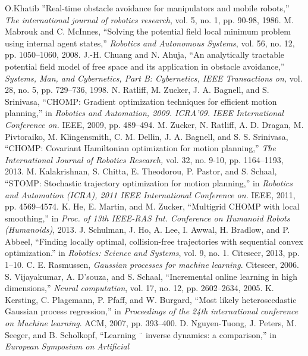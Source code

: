 \documentclass{IEEEtran}
\begin{document}
\begin{thebibliography}{99}
O.Khatib ''Real-time obstacle avoidance for manipulators and mobile
robots,''\emph{ The international journal of robotics research}, vol. 5, no. 1,
pp. 90-98, 1986.
M. Mabrouk and C. McInnes, “Solving the potential field local minimum problem using internal agent states,” \emph {Robotics and Autonomous
Systems}, vol. 56, no. 12, pp. 1050–1060, 2008.
J.-H. Chuang and N. Ahuja, “An analytically tractable potential field
model of free space and its application in obstacle avoidance,” \emph{Systems,
Man, and Cybernetics, Part B: Cybernetics, IEEE Transactions on,}
vol. 28, no. 5, pp. 729–736, 1998.
N. Ratliff, M. Zucker, J. A. Bagnell, and S. Srinivasa, “CHOMP:
Gradient optimization techniques for efficient motion planning,” in\emph{
Robotics and Automation, 2009. ICRA’09. IEEE International Conference on.} IEEE, 2009, pp. 489–494.
M. Zucker, N. Ratliff, A. D. Dragan, M. Pivtoraiko, M. Klingensmith,
C. M. Dellin, J. A. Bagnell, and S. S. Srinivasa, “CHOMP: Covariant
Hamiltonian optimization for motion planning,” \emph{The International
Journal of Robotics Research,} vol. 32, no. 9-10, pp. 1164–1193, 2013.
M. Kalakrishnan, S. Chitta, E. Theodorou, P. Pastor, and S. Schaal,
“STOMP: Stochastic trajectory optimization for motion planning,” in
\emph{Robotics and Automation (ICRA), 2011 IEEE International Conference
on.} IEEE, 2011, pp. 4569–4574.
K. He, E. Martin, and M. Zucker, “Multigrid CHOMP with local
smoothing,” in \emph{Proc. of 13th IEEE-RAS Int. Conference on Humanoid
Robots (Humanoids)}, 2013.
J. Schulman, J. Ho, A. Lee, I. Awwal, H. Bradlow, and P. Abbeel,
“Finding locally optimal, collision-free trajectories with sequential
convex optimization.” in \emph{Robotics: Science and Systems}, vol. 9, no. 1.
Citeseer, 2013, pp. 1–10.
C. E. Rasmussen, \emph{Gaussian processes for machine learning}. Citeseer,
2006.
S. Vijayakumar, A. D’souza, and S. Schaal, “Incremental online
learning in high dimensions,” \emph{Neural computation}, vol. 17, no. 12,
pp. 2602–2634, 2005.
K. Kersting, C. Plagemann, P. Pfaff, and W. Burgard, “Most likely
heteroscedastic Gaussian process regression,” in \emph{Proceedings of the
24th international conference on Machine learning}. ACM, 2007, pp.
393–400.
D. Nguyen-Tuong, J. Peters, M. Seeger, and B. Scholkopf, “Learning ¨
inverse dynamics: a comparison,” in \emph{European Symposium on Artificial
}
\end{thebibliography}
\end{document}
